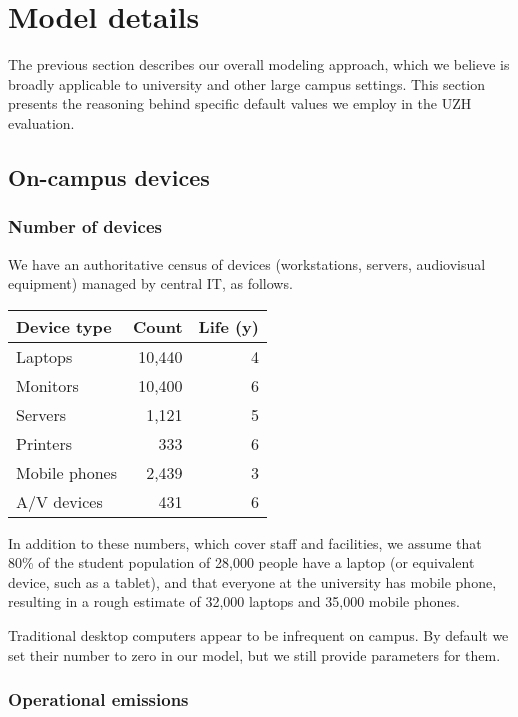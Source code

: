 \documentclass[11pt]{article}
\begin{document}
\section{Model details}
\label{sec:model:details}

The previous section describes our overall modeling approach, which we believe is broadly applicable to university and other large campus settings. This section presents the reasoning behind specific default values we employ in the UZH evaluation.

\subsection{On-campus devices}

\subsubsection*{Number of devices}

We have an authoritative census of devices (workstations, servers, audiovisual equipment) managed by central IT, as follows.

\begin{center}
  \begin{tabular}{|l|r|r|}
  \hline
  \textbf{Device type} & \textbf{Count} & \textbf{Life (y)}\\ \hline
  Laptops & 10,440 & 4 \\
  Monitors & 10,400 & 6 \\
  Servers & 1,121 & 5 \\
  Printers & 333 & 6 \\
  Mobile phones & 2,439 & 3 \\
  A/V devices & 431 & 6 \\ \hline
  \end{tabular}
  \label{tab:oncampusdevices}
\end{center}

In addition to these numbers, which cover staff and facilities, we assume that 80\% of the student population of 28,000 people have a laptop (or equivalent device, such as a tablet), and that everyone at the university has mobile phone, resulting in a rough estimate of 32,000 laptops and 35,000 mobile phones.

Traditional desktop computers appear to be infrequent on campus. By default we set their number to zero in our model, but we still provide parameters for them.

\subsubsection*{Operational emissions}
\end{document}
